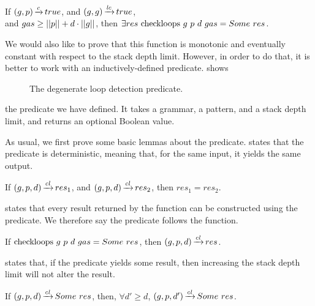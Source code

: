\begin{lemma}%
    If $(g,p) \operatorname{\xrightarrow{\mathit{c}}} true$,
    and $(g,g) \operatorname{\xrightarrow{\mathit{lc}}} true$, \\
    and $gas \ge ||p|| + d \cdot ||g||$,
    then $\exists res\ \checkloopscomp{g}{p}{d}{gas} = \Some res$.
    \label{lemma:checkloops-termination}
\end{lemma}

We would also like to prove that
this function is monotonic and
eventually constant with
respect to the stack depth limit.
However, in order to do that,
it is better to work with
an inductively-defined predicate.
 shows
\begin{figure}
    \centering
    
    \caption{The degenerate loop detection predicate.}
    \label{fig:checkloops}
\end{figure}
the predicate we have defined.
It takes a grammar,
a pattern,
and a stack depth limit,
and returns an optional Boolean value.

As usual, we first prove
some basic lemmas about the predicate.
states that the predicate
is deterministic,
meaning that, for the same input,
it yields the same output.

\begin{lemma}
    If $(g,p,d) \operatorname{\xrightarrow{\mathit{cl}}} res_1$,
    and $(g,p,d) \operatorname{\xrightarrow{\mathit{cl}}} res_2$,
    then $res_1 = res_2$.
    \label{lemma:checkloops-determinism}
\end{lemma}

states that every result returned by the function
can be constructed using the predicate.
We therefore say the predicate follows
the function.

\begin{lemma}
    If $\text{checkloops}\ g\ p\ d\ gas = Some\ res$,
    then $(g,p,d) \operatorname{\xrightarrow{\mathit{cl}}} res$.
    \label{lemma:checkloops-follows}
\end{lemma}

states that, if the predicate yields some result,
then increasing the stack depth limit
will not alter the result.

\begin{lemma}%
    If $(g,p,d) \operatorname{\xrightarrow{\mathit{cl}}} Some\ res$,
    then, $\forall d' \ge d$,
    $(g,p,d') \operatorname{\xrightarrow{\mathit{cl}}} Some\ res$.
    \label{lemma:checkloops-d-increase-no-overflow}
\end{lemma}

